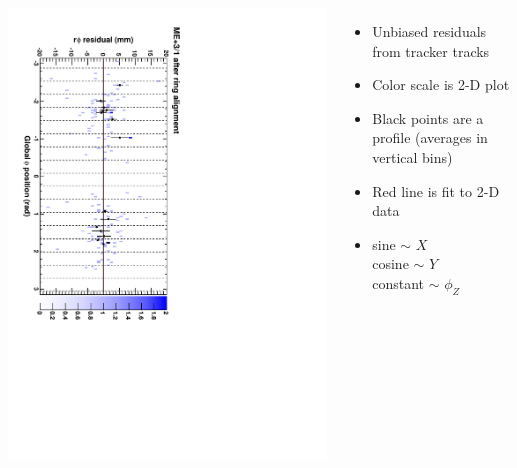 \documentclass[compress]{beamer}
\begin{document}
\begin{frame}
\begin{columns}
\includegraphics[height=\linewidth, angle=90]{ringfits_after/mep31.pdf}
\begin{itemize}
\item Unbiased residuals from tracker tracks
\item Color scale is 2-D plot
\item Black points are a profile (averages in vertical bins)
\item Red line is fit to 2-D data
\item sine $\sim$ $X$ \\
cosine $\sim$ $Y$ \\
constant $\sim$ $\phi_Z$
\end{itemize}
\end{columns}
\end{frame}
\end{document}
